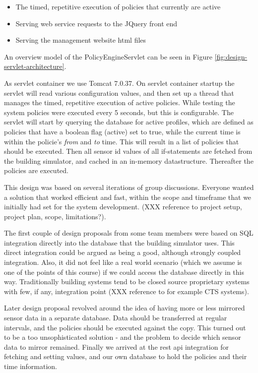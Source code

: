 \begin{itemize}
	\item The timed, repetitive execution of policies that currently are active
	\item Serving web service requests to the JQuery front end
	\item Serving the management website html files
\end{itemize}

An overview model of the PolicyEngineServlet can be seen in Figure \ref{fig:design-servlet-architecture}.

As servlet container we use Tomcat 7.0.37. On servlet container startup the servlet will read various configuration values, and then set up a thread that manages the timed, repetitive execution of active policies. While testing the system policies were executed every 5 seconds, but this is configurable. The servlet will start by querying the database for active profiles, which are defined as policies that have a boolean flag (active) set to true, while the current time is within the policie's \textit{from} and \textit{to} time. This will result in a list of policies that should be executed. Then all sensor id values of all if-statements are fetched from the building simulator, and cached in an in-memory datastructure. Thereafter the policies are executed. 

This design was based on several iterations of group discussions. Everyone wanted a solution that worked efficient and fast, within the scope and timeframe that we initially had set for the system development. (XXX reference to project setup, project plan, scope, limitations?). 

The first couple of design proposals from some team members were based on SQL integration directly into the database that the building simulator uses. This direct integration could be argued as being a good, although strongly coupled integration. Also, it did not feel like a real world scenario (which we assume is one of the points of this course) if we could access the database directly in this way. Traditionally building systems tend to be closed source proprietary systems with few, if any, integration point (XXX reference to for example CTS systems).

Later design proposal revolved around the idea of having more or less mirrored sensor data in a separate database. Data should be transferred at regular intervals, and the policies should be executed against the copy. This turned out to be a too unsophisticated solution - and the problem to decide which sensor data to mirror remained. Finally we arrived at the rest api integration for fetching and setting values, and our own database to hold the policies and their time information.

